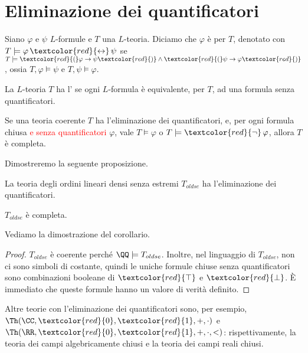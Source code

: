 \section{Eliminazione dei quantificatori}

\begin{definition}
    Siano $\varphi$ e $\psi$ $L$-formule e $T$ una $L$-teoria. Diciamo che $\varphi$ è  per $T$,
    denotato con $T \models \varphi \,\textcolor{red}{\leftrightarrow}\, \psi$ se $T \models \textcolor{red}{(} \varphi \rightarrow \psi \textcolor{red}{)} \land \textcolor{red}{(} \psi \rightarrow \varphi \textcolor{red}{)}$,
    ossia $T,\varphi \models \psi$ e $T,\psi \models \varphi$.
\end{definition}

\begin{definition}
    La $L$-teoria $T$ ha l' se ogni $L$-formula è equivalente, per $T$,
    ad una formula senza quantificatori.
\end{definition}

Se una teoria coerente $T$ ha l'eliminazione dei quantificatori, e, per ogni formula chiusa \textcolor{red}{e senza quantificatori} $\varphi$, 
vale $T \models \varphi$ o $T \models \textcolor{red}{\neg} \,\varphi$, allora $T$ è completa.

Dimostreremo la seguente proposizione.

\begin{proposition}
    La teoria degli ordini lineari densi senza estremi $T_{oldse}$ ha l'eliminazione dei quantificatori.
\end{proposition}

\begin{corollary}
    $T_{oldse}$ è completa.
\end{corollary}

Vediamo la dimostrazione del corollario.

\begin{proof}
    $T_{oldse}$ è coerente perché $\QQ \models T_{oldse}$. Inoltre, nel linguaggio di $T_{oldse}$,
    non ci sono simboli di costante, quindi le uniche formule chiuse senza quantificatori sono 
    combinazioni booleane di $\textcolor{red}{\top}$ e $\textcolor{red}{\bot}$. È immediato che queste formule
    hanno un valore di verità definito.
\end{proof}

Altre teorie con l'eliminazione dei quantificatori sono, per esempio, $\Th(\CC,\textcolor{red}{0},\textcolor{red}{1},+,\cdot)$ e $\Th(\RR,\textcolor{red}{0},\textcolor{red}{1},+,\cdot,<)$:
rispettivamente, la teoria dei campi algebricamente chiusi e la teoria dei campi reali chiusi.


